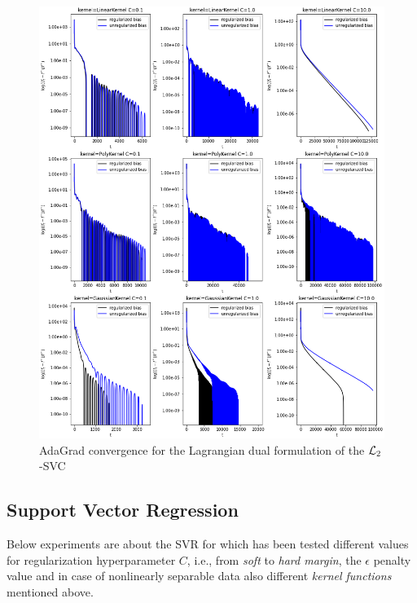 

\begin{figure}[H]
	\centering
	\includegraphics[scale=0.55]{img/lagrangian_dual_l2_svc_loss_history}
	\caption{AdaGrad convergence for the Lagrangian dual formulation of the $\protect \mathcal{L}_2$-SVC}
	\label{fig:lagrangian_dual_l2_svc_loss_history}
\end{figure}

\pagebreak

\subsection{Support Vector Regression}

Below experiments are about the SVR for which has been tested different values for regularization hyperparameter $C$, i.e., from \emph{soft} to \emph{hard margin}, the $\epsilon$ penalty value and in case of nonlinearly separable data also different \emph{kernel functions} mentioned above.

